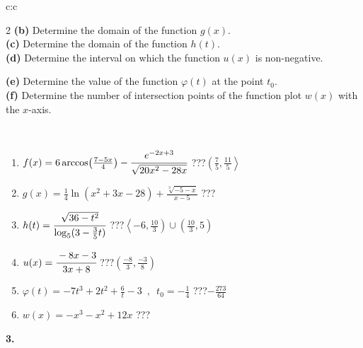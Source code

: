 \documentclass[10pt]{report}
\begin{document}
\begin{tabular}{c:c}
\begin{minipage}[c][104.5mm][t]{0.5\linewidth}
\begin{center}
\begin{minipage}{0.95\linewidth}
\begin{center}
{\begin{multicols}{2}
\textbf{(b)} Determine the domain of the function \(g(x)\). \\[1mm]
\textbf{(c)} Determine the domain of the function \(h(t)\). \\[1mm]
\textbf{(d)} Determine the interval on which the function \(u(x)\) is non-negative. \par \columnbreak
\textbf{(e)} Determine the value of the function \(\varphi(t)\) at the point \(t_0\). \\[1mm]
\textbf{(f)} Determine the number of intersection points of the function plot \(w(x)\) with the \(x\)-axis. \\[1mm]
\end{multicols}
}
\end{center}
\end{minipage}
\\[4mm]
\begin{minipage}{0.79\linewidth}
\begin{center}
\begin{varwidth}{\linewidth}
\begin{enumerate}
\small
\item $f(x) = 6\arccos\!\left( \frac{7-5x}{4} \right) - \cfrac{e^{-2x+3}}{\sqrt{20x^2-28x}}$\quad \dotfill\; ???\;\dotfill \quad $\left(\frac{7}{5} , \frac{11}{5}\right\rangle$
\item $g(x) = \frac{1}{4} \ln{\!(x^2+3x-28)}+\frac{\sqrt[3]{-5-x}}{x-5}$\quad \dotfill\; ???\;\dotfill {}
\item $h(t) = \cfrac{\sqrt{36-t^2}}{\log_5(3-\frac{3}{5}t)}$\quad \dotfill\; ???\;\dotfill \quad $\left\langle-6 , \frac{10}{3}\right)\cup\left(\frac{10}{3} , 5\right)$
\item $u(x) = \cfrac{-8x-3}{3x+8}$\quad \dotfill\; ???\;\dotfill \quad $\left(\frac{-8}{3} , \frac{-3}{8}\right)$
\item $\varphi(t) = -7t^3+2t^2+\frac{6}{t}-3 \enspace , \enspace t_0=-\frac{1}{4}$\quad \dotfill\; ???\;\dotfill \quad $-\frac{273}{64}$
\item $w(x) = -x^3-x^2+12x$\quad \dotfill\; ???\;\dotfill {}
\end{enumerate}
\end{varwidth}
\end{center}
\end{minipage}
\begin{minipage}{0.20\linewidth}
\begin{center}
{\Huge\bfseries 3.} \\[2mm]

\end{center}
\end{minipage}
\end{center}
\end{minipage}
\end{tabular}
\end{document}
